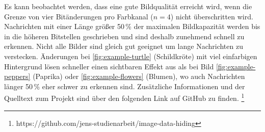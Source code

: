\newpage



\newpage



\newpage



\newpage

\noindent
Es kann beobachtet werden, dass
eine gute Bildqualität erreicht wird,
wenn die Grenze von vier Bitänderungen pro Farbkanal ($n = 4$) nicht überschritten wird.
Nachrichten mit einer Länge größer 50\,\% der maximalen Bildkapazität werden bis in die höheren
Bitstellen geschrieben und sind deshalb zunehmend schnell zu erkennen.
Nicht alle Bilder sind gleich gut geeignet um lange Nachrichten zu verstecken.
Änderungen bei \ref{fig:example-turtle} (Schildkröte) mit viel einfarbigen Hintergrund
lösen schneller einen sichtbaren Effekt aus als bei Bild \ref{fig:example-peppers}
(Paprika) oder \ref{fig:example-flowers} (Blumen), wo auch Nachrichten länger
50\,\% eher schwer zu erkennen sind.
Zusätzliche Informationen und der Quelltext zum Projekt
sind über den folgenden Link auf GitHub zu finden.
\footnote{https://github.com/jens-studienarbeit/image-data-hiding}
